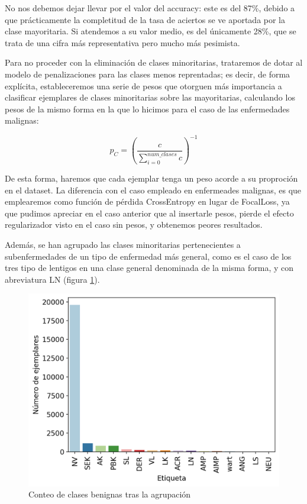 No nos debemos dejar llevar por el valor del accuracy: este es del 87\%, debido a que prácticamente la completitud de la tasa de aciertos se ve aportada por la clase mayoritaria. Si atendemos a su valor medio, es del únicamente 28\%, que se trata de una cifra más representativa pero mucho más pesimista.

Para no proceder con la eliminación de clases minoritarias, trataremos de dotar al modelo de penalizaciones para las clases menos reprentadas; es decir, de forma explícita, estableceremos una serie de pesos que otorguen más importancia a clasificar ejemplares de clases minoritarias sobre las mayoritarias, calculando los pesos de la mismo forma en la que lo hicimos para el caso de las enfermedades malignas:

$$p_C =(\frac{c}{\sum_{i=0}^{num\_clases} c} )^{-1}$$

De esta forma, haremos que cada ejemplar tenga un peso acorde a su proproción en el dataset. La diferencia con el caso empleado en enfermeades malignas, es que emplearemos como función de pérdida CrossEntropy en lugar de FocalLoss, ya que pudimos apreciar en el caso anterior que al insertarle pesos, pierde el efecto regularizador visto en el caso sin pesos, y obtenemos peores resultados.

Además, se han agrupado las clases minoritarias pertenecientes a subenfermedades de un tipo de enfermedad más general, como es el caso de los tres tipo de lentigos en una clase general denominada de la misma forma, y con abreviatura LN (figura  \ref{fig:buenasred}).

\begin{figure}[H]
	\centering
	\includegraphics[scale = 0.7]{imagenes/countbenign_corrected.png}
	\caption{Conteo de clases benignas tras la agrupación}
	\label {fig:buenasred}
\end{figure}

